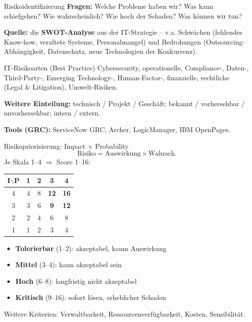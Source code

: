\documentclass[a4paper, fontsize=7pt]{scrartcl}
\renewcommand*{\arraystretch}{1.5}  %
\begin{document}
\begin{subbox}{Risikoidentifizierung}
\textbf{Fragen:} Welche Probleme haben wir? Was kann schiefgehen? Wie
wahrscheinlich? Wie hoch der Schaden? Was können wir tun?

\textbf{Quelle:} die \textbf{SWOT-Analyse} aus der IT-Strategie --
v.a. Schwächen (fehlendes Know-how, veraltete Systeme, Personalmangel) und
Bedrohungen (Outsourcing-Abhängigkeit, Datenschutz, neue Technologien der
Konkurrenz).
\end{subbox}

\begin{subbox}{IT-Risikoarten (Best Practice)}
Cybersecurity, operationelle, Compliance-, Daten-, Third-Party-, Emerging
Technology-, Human-Factor-, finanzielle, rechtliche (Legal \& Litigation),
Umwelt-Risiken.

\textbf{Weitere Einteilung:} technisch / Projekt / Geschäft; bekannt /
vorhersehbar / unvorhersehbar; intern / extern.

\textbf{Tools (GRC):} ServiceNow GRC, Archer, LogicManager, IBM OpenPages.
\end{subbox}

\begin{mainbox}{Risikopriorisierung: Impact $\times$ Probability}
$$\boxed{\text{Risiko} = \text{Auswirkung} \times \text{Wahrsch.}}$$
Je Skala 1--4 $\Rightarrow$ Score 1--16:
\renewcommand*{\arraystretch}{1.15}
\begin{center}
\begin{tabular}{c|cccc}
I$\backslash$P & 1 & 2 & 3 & 4 \\
\hline
4 & 4 & 8 & \textbf{12} & \textbf{16} \\
3 & 3 & 6 & \textbf{9} & \textbf{12} \\
2 & 2 & 4 & 6 & 8 \\
1 & 1 & 2 & 3 & 4 \\
\end{tabular}
\end{center}
\begin{itemize}
    \item \textbf{Tolerierbar} (1--2): akzeptabel, kaum Auswirkung
    \item \textbf{Mittel} (3--4): kann akzeptabel sein
    \item \textbf{Hoch} (6--8): langfristig nicht akzeptabel
    \item \textbf{Kritisch} (9--16): sofort lösen, erheblicher Schaden
\end{itemize}
Weitere Kriterien: Verwaltbarkeit, Ressourcenverfügbarkeit, Kosten,
Sensibilität.
\end{mainbox}
\end{document}
